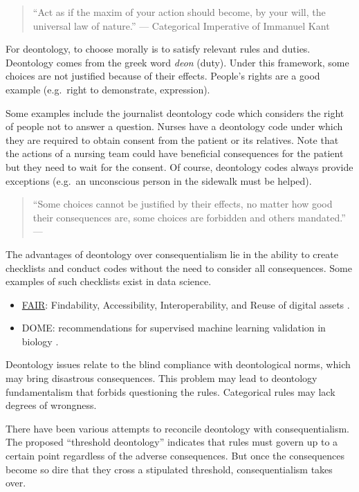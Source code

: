 \documentclass[
]{book}
\providecommand{\tightlist}{%
  \setlength{\itemsep}{0pt}\setlength{\parskip}{0pt}}
\begin{document}
\begin{quote}
``Act as if the maxim of your action should become, by your will, the universal law of nature.'' --- Categorical Imperative of Immanuel Kant
\end{quote}

For deontology, to choose morally is to satisfy relevant rules and duties. Deontology comes from the greek word \emph{deon} (duty). Under this framework, some choices are not justified because of their effects. People's rights are a good example (e.g.~right to demonstrate, expression).

Some examples include the journalist deontology code which considers the right of people not to answer a question. Nurses have a deontology code under which they are required to obtain consent from the patient or its relatives. Note that the actions of a nursing team could have beneficial consequences for the patient but they need to wait for the consent. Of course, deontology codes always provide exceptions (e.g.~an unconscious person in the sidewalk must be helped).

\begin{quote}
``Some choices cannot be justified by their effects, no matter how good their consequences are, some choices are forbidden and others mandated.'' --- \citep{sep-ethics-deontological}
\end{quote}

The advantages of deontology over consequentialism lie in the ability to create checklists and conduct codes without the need to consider all consequences. Some examples of such checklists exist in data science.

\begin{itemize}
\tightlist
\item
  \href{https://www.go-fair.org/}{FAIR}: Findability, Accessibility, Interoperability, and Reuse of digital assets \citep{wilkinson2016fair}.
\item
  DOME: recommendations for supervised machine learning validation in biology \citep{walsh2021dome}.
\end{itemize}

Deontology issues relate to the blind compliance with deontological norms, which may bring disastrous consequences. This problem may lead to deontology fundamentalism that forbids questioning the rules. Categorical rules may lack degrees of wrongness.

There have been various attempts to reconcile deontology with consequentialism. The proposed ``threshold deontology'' indicates that rules must govern up to a certain point regardless of the adverse consequences. But once the consequences become so dire that they cross a stipulated threshold, consequentialism takes over.
\end{document}
